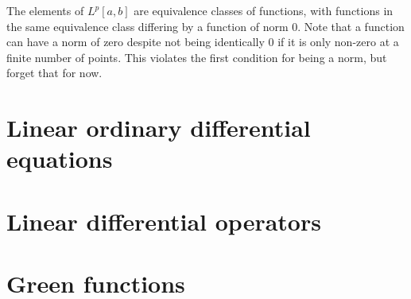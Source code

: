 \documentclass[]{article}
\begin{document}
The elements of $L^{p}[a,b]$ are equivalence classes of functions, with functions in the same equivalence class differing by a function of norm $0$. Note that a function can have a norm of zero despite not being identically 0 if it is only non-zero at a finite number of points. This violates the first condition for being a norm, but forget that for now.


\newpage
\section{Linear ordinary differential equations}


\newpage
\section{Linear differential operators}


\newpage
\section{Green functions}
\end{document}
